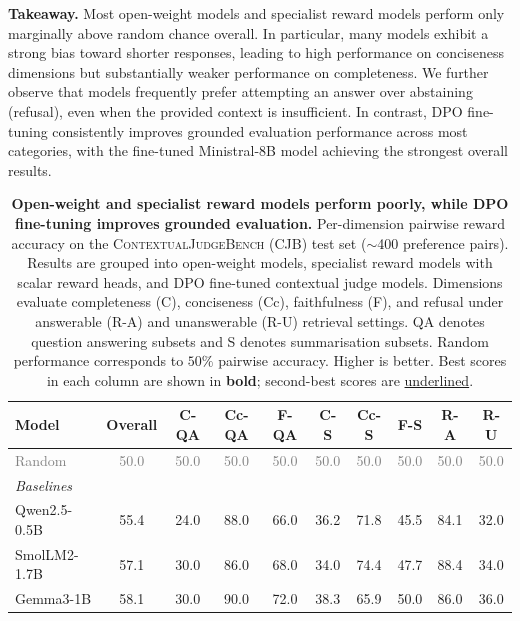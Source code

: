 \documentclass{article}
\theoremstyle{plain}
\theoremstyle{definition}
\theoremstyle{remark}
\begin{document}
\textbf{Takeaway.} Most open-weight models and specialist reward models perform only marginally above random chance overall. In particular, many models exhibit a strong bias toward shorter responses, leading to high performance on conciseness dimensions but substantially weaker performance on completeness. We further observe that models frequently prefer attempting an answer over abstaining (refusal), even when the provided context is insufficient. In contrast, DPO fine-tuning consistently improves grounded evaluation performance across most categories, with the fine-tuned Ministral-8B model achieving the strongest overall results.

\begin{table}[t]
\centering
\caption{\textbf{Open-weight and specialist reward models perform poorly, while DPO fine-tuning improves grounded evaluation.}
Per-dimension pairwise reward accuracy on the \textsc{ContextualJudgeBench} (CJB) test set ($\sim$400 preference pairs). Results are grouped into open-weight models, specialist reward models with scalar reward heads, and DPO fine-tuned contextual judge models. Dimensions evaluate completeness (C), conciseness (Cc), faithfulness (F), and refusal under answerable (R-A) and unanswerable (R-U) retrieval settings. QA denotes question answering subsets and S denotes summarisation subsets. Random performance corresponds to $50\%$ pairwise accuracy. Higher is better. Best scores in each column are shown in \textbf{bold}; second-best scores are \underline{underlined}.}
\label{app:tab:cjb-full}
\smallskip
\small
\setlength{\tabcolsep}{3.5pt}
\begin{tabular}{lccccccccc}
\toprule
\textbf{Model} & \textbf{Overall} & \textbf{C-QA} & \textbf{Cc-QA} & \textbf{F-QA} & \textbf{C-S} & \textbf{Cc-S} & \textbf{F-S} & \textbf{R-A} & \textbf{R-U} \\
\midrule
\textcolor{gray}{Random} &
\textcolor{gray}{50.0} &
\textcolor{gray}{50.0} &
\textcolor{gray}{50.0} &
\textcolor{gray}{50.0} &
\textcolor{gray}{50.0} &
\textcolor{gray}{50.0} &
\textcolor{gray}{50.0} &
\textcolor{gray}{50.0} &
\textcolor{gray}{50.0} \\
\midrule
\multicolumn{10}{l}{\textit{Baselines}} \\
Qwen2.5-0.5B   & 55.4 & 24.0 & 88.0 & 66.0 & 36.2 & 71.8 & 45.5 & 84.1 & 32.0 \\
SmolLM2-1.7B   & 57.1 & 30.0 & 86.0 & 68.0 & 34.0 & 74.4 & 47.7 & 88.4 & 34.0 \\
Gemma3-1B      & 58.1 & 30.0 & 90.0 & 72.0 & 38.3 & 65.9 & 50.0 & 86.0 & 36.0 \\

\end{tabular}
\end{table}
\end{document}
